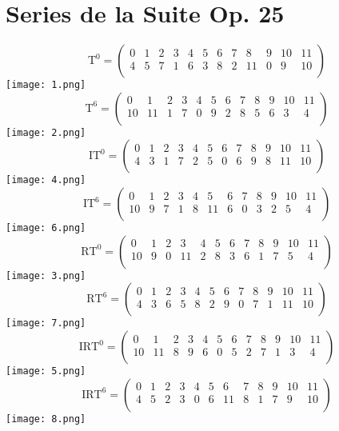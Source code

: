 \chapter{Series de la Suite Op. 25}
	\label{app:series}
	
	\newpage
	$$\text{T}^0=\left(\begin{matrix}0&1&2&3&4&5&6&7&8&9&10&11\\4&5&7&1&6&3&8&2&11&0&9&10\\\end{matrix}\right)$$
	\texttt{[image: 1.png]}
	\bigskip\bigskip
	$$\text{T}^6=\left(\begin{matrix}0&1&2&3&4&5&6&7&8&9&10&11\\10&11&1&7&0&9&2&8&5&6&3&4\\\end{matrix}\right)$$
	\texttt{[image: 2.png]}
	\bigskip\bigskip
	$$\text{IT}^0=\left(\begin{matrix}0&1&2&3&4&5&6&7&8&9&10&11\\4&3&1&7&2&5&0&6&9&8&11&10\\\end{matrix}\right)$$
	\texttt{[image: 4.png]}
	\bigskip\bigskip
	$$\text{IT}^6=\left(\begin{matrix}0&1&2&3&4&5&6&7&8&9&10&11\\10&9&7&1&8&11&6&0&3&2&5&4\\\end{matrix}\right)$$
	\texttt{[image: 6.png]}
	\newpage
	$$\text{RT}^0=\left(\begin{matrix}0&1&2&3&4&5&6&7&8&9&10&11\\10&9&0&11&2&8&3&6&1&7&5&4\\\end{matrix}\right)$$
	\texttt{[image: 3.png]}
	\bigskip\bigskip
	$$\text{RT}^6=\left(\begin{matrix}0&1&2&3&4&5&6&7&8&9&10&11\\4&3&6&5&8&2&9&0&7&1&11&10\\\end{matrix}\right)$$
	\texttt{[image: 7.png]}
	\bigskip\bigskip
	$$\text{IRT}^0=\left(\begin{matrix}0&1&2&3&4&5&6&7&8&9&10&11\\10&11&8&9&6&0&5&2&7&1&3&4\\\end{matrix}\right)$$
	\texttt{[image: 5.png]}
	\bigskip\bigskip
	$$\text{IRT}^6=\left(\begin{matrix}0&1&2&3&4&5&6&7&8&9&10&11\\4&5&2&3&0&6&11&8&1&7&9&10\\\end{matrix}\right)$$
	\texttt{[image: 8.png]}